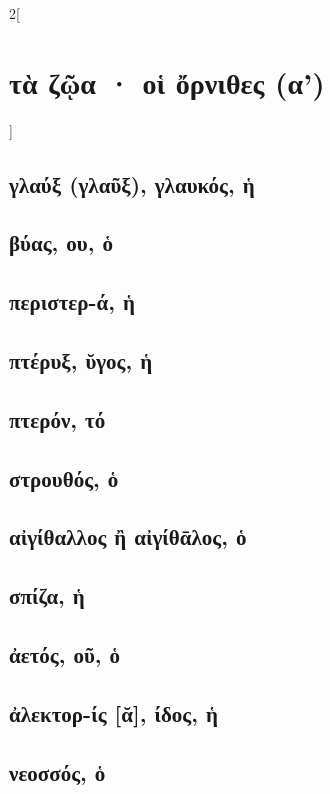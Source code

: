 \documentclass{book}
\begin{document}
\begin{multicols}{2}[\section{τὰ ζῷα · οἱ ὄρνιθες (α')}]
{\renewcommand \thesubsection {\thesection} }
\subsection{γλαύξ (γλαῦξ), γλαυκός, ἡ}
\subsection{βύας, ου, ὁ}
\subsection{περιστερ-ά, ἡ}
\subsection{πτέρυξ, ῠγος, ἡ}
\subsection{πτερόν, τό}
\subsection{στρουθός, ὁ}
\subsection{αἰγίθαλλος ἢ αἰγίθᾱλος, ὁ}
\subsection{σπίζα, ἡ}
\subsection{ἀετός, οῦ, ὁ}
\subsection{ἀλεκτορ-ίς [ᾰ], ίδος, ἡ}
\subsection{νεοσσός, ὁ}

\end{multicols}
\end{document}
